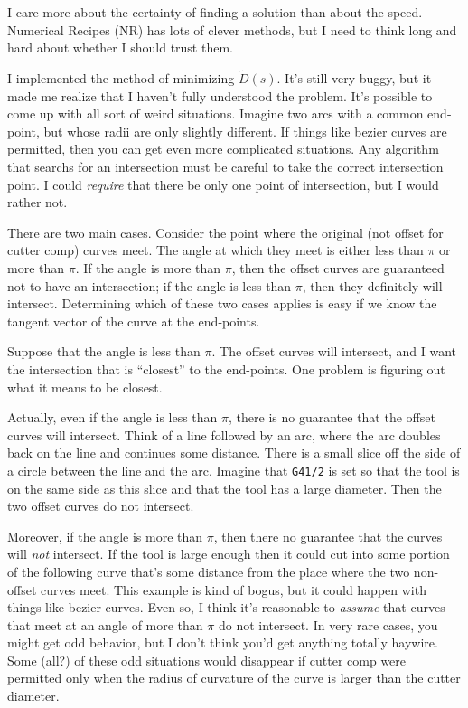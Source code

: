 \documentclass[titlepage,oneside,10pt]{article}
\begin{document}
I care more about the certainty of finding a solution than about the
speed. Numerical Recipes (NR) has lots of clever methods, but I need
to think long and hard about whether I should trust them.

I implemented the method of minimizing $\tilde{D}(s)$. It's still very
buggy, but it made me realize that I haven't fully understood the
problem. It's possible to come up with all sort of weird
situations. Imagine two arcs with a common end-point, but whose radii are only
slightly different. If things like bezier curves are permitted, then
you can get even more complicated situations. Any algorithm that
searchs for an intersection must be careful to take the correct
intersection point. I could \emph{require} that there be only one
point of intersection, but I would rather not.

There are two main cases. Consider the point where the 
original (not offset for cutter comp) curves meet. The angle at which
they meet is either less than $\pi$ or more than $\pi$. If the angle
is more than $\pi$, then the offset curves are guaranteed not to have
an intersection; if the angle is less than $\pi$, then they definitely
will intersect. Determining which of these two cases applies is easy
if we know the tangent vector of the curve at the end-points.

Suppose that the angle is less than $\pi$. The offset curves will
intersect, and I want the intersection that is ``closest'' to the
end-points. One problem is figuring out what it means to be closest.

Actually, even if the angle is less than $\pi$, there is no guarantee
that the offset curves will intersect. Think of a line followed by an
arc, where the arc doubles back on the line and continues some
distance. There is a small slice off the side of a circle between the
line and the arc. Imagine that {\tt G41/2} is set so that the tool is
on the same side as this slice and that the tool has a large
diameter. Then the two offset curves do not intersect.

Moreover, if the angle is more than $\pi$, then there no guarantee
that the curves will \emph{not} intersect. If the tool is large enough
then it could cut into some portion of the following curve that's some
distance from the place where the two non-offset curves meet. This
example is kind of bogus, but it could happen with things like bezier
curves. Even so, I think it's reasonable to \emph{assume} that curves
that meet at an angle of more than $\pi$ do not intersect. In very
rare cases, you might get odd behavior, but I don't think you'd get
anything totally haywire. Some (all?) of these odd situations would
disappear if cutter comp were permitted only when the radius of
curvature of the curve is larger than the cutter diameter.
\end{document}
